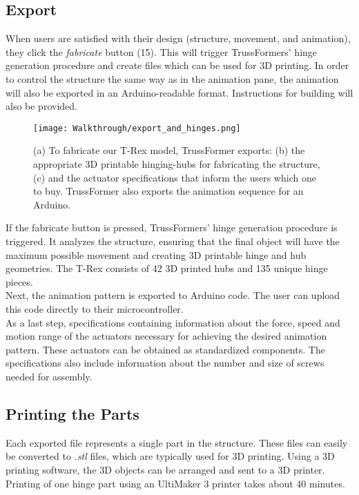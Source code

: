 \subsection{Export}
When users are satisfied with their design (structure, movement, and animation), they click the \textit{fabricate} button (15). This will trigger TrussFormers' hinge generation procedure and create files which can be used for 3D printing. In order to control the structure the same way as in the animation pane, the animation will also be exported in an Arduino-readable format. Instructions for building will also be provided.
\begin{figure}[h!]
    \texttt{[image: Walkthrough/export\_and\_hinges.png]}
    \centering
    \caption{(a) To fabricate our T-Rex model, TrussFormer exports: (b) the appropriate 3D printable hinging-hubs for fabricating the structure, (c) and the actuator specifications that inform the users which one to buy. TrussFormer also exports the animation sequence for an Arduino.}
    \label{fig:export_and_hinges}
\end{figure}

If the fabricate button is pressed, TrussFormers' hinge generation procedure is triggered. It analyzes the structure, ensuring that the final object will have the maximum possible movement and creating 3D printable hinge and hub geometries. The T-Rex consists of 42 3D printed hubs and 135 unique hinge pieces.\\
Next, the animation pattern is exported to Arduino code. The user can upload this code directly to their microcontroller.\\
As a last step, specifications containing information about the force, speed and motion range of the actuators necessary for achieving the desired animation pattern. These actuators can be obtained as standardized components. The specifications also include information about the number and size of screws needed for assembly.

\subsection{Printing the Parts}
Each exported file represents a single part in the structure. These files can easily be converted to \textit{.stl} files, which are typically used for 3D printing. Using a 3D printing software, the 3D objects can be arranged and sent to a 3D printer. Printing of one hinge part using an UltiMaker 3 printer takes about 40 minutes.

